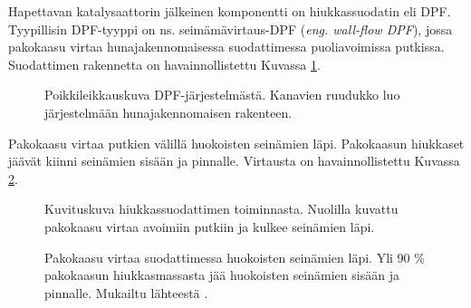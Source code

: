 Hapettavan katalysaattorin jälkeinen komponentti on hiukkassuodatin eli DPF.
Tyypillisin DPF-tyyppi on ns. seimämävirtaus-DPF (\emph{eng. wall-flow DPF}), jossa pakokaasu virtaa hunajakennomaisessa suodattimessa puoliavoimissa putkissa. Suodattimen rakennetta on havainnollistettu Kuvassa \ref{fig:honeycomb}.
\begin{figure}[H]
    \centering
    \caption{Poikkileikkauskuva DPF-järjestelmästä. Kanavien ruudukko luo järjestelmään hunajakennomaisen rakenteen.}
    \label{fig:honeycomb}
\end{figure}

Pakokaasu virtaa putkien välillä huokoisten seinämien läpi. Pakokaasun hiukkaset jäävät kiinni seinämien sisään ja pinnalle. Virtausta on havainnollistettu Kuvassa \ref{fig:wall-flow-dpf}.
%
\begin{figure}[H]
    \centering 
               {Kuvituskuva hiukkassuodattimen toiminnasta. Nuolilla kuvattu pakokaasu virtaa avoimiin putkiin ja kulkee seinämien läpi.}
    \caption{Pakokaasu virtaa suodattimessa huokoisten seinämien läpi. Yli 90 \% pakokaasun hiukkasmassasta jää huokoisten seinämien sisään ja pinnalle. Mukailtu lähteestä \cite{dieselnet_dpf}.}
    \label{fig:wall-flow-dpf}
\end{figure}
%


